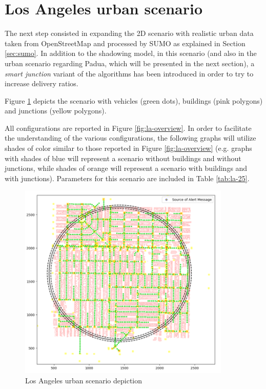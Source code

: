 	\section{Los Angeles urban scenario}
		\label{sec:la-scenario}
		The next step consisted in expanding the 2D scenario with realistic urban data taken from OpenStreetMap and processed by SUMO as explained in Section \ref{sec:sumo}. In addition to the shadowing model, in this scenario (and also in the urban scenario regarding Padua, which will be presented in the next section), a \textit{smart junction} variant of the algorithms has been introduced in order to try to increase delivery ratios. 
		
		Figure \ref{fig:la-scenario} depicts the scenario with vehicles (green dots), buildings (pink polygons) and junctions (yellow polygons).
		
		
		All configurations are reported in Figure \ref{fig:la-overview}. In order to facilitate the understanding of the various configurations, the following graphs will utilize shades of color similar to those reported in Figure \ref{fig:la-overview} (e.g. graphs with shades of blue will represent a scenario without buildings and without junctions, while shades of orange will represent a scenario with buildings and with junctions). Parameters for this scenario are included in Table \ref{tab:la-25}.  
		
		\begin{figure}[H]
			\centering
			\includegraphics[width=0.90\textwidth]{immagini/la-25/la-scenario}
			\caption{Los Angeles urban scenario depiction}
			\label{fig:la-scenario}
		\end{figure}
		
